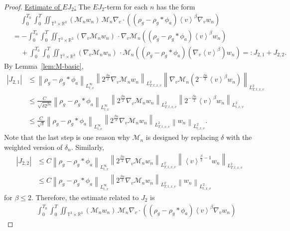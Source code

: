 \documentclass[11pt,american, reqno]{amsart}
\numberwithin{equation}{section}
\newcommand{\R}{\mathbb R}
\newcommand{\1}{\mathds{1}}
\newcommand{\Ni}{\noindent}
\newcommand{\CalM}{\mathcal{M}}
\newcommand{\vpran}[1]{\left(#1\right)}
\newcommand{\nn}{\nonumber}
\newcommand{\norm}[1]{\left\lVert#1\right\rVert}
\newcommand{\abs}[1]{\left\vert#1\right\vert}
\newcommand{\vint}[1]{\left\langle#1\right\rangle}
\newcommand{\T}{\mathbb{T}}
\numberwithin{equation}{section}
\begin{document}
\begin{proof}
\Ni \underline{Estimate of $EJ_2$:} The $EJ_2$-term for each $n$ has the form
\begin{align*}
& \quad \,
 \int_0^{T_0} \int_0^T \iint_{\T^3 \times \R^3}
   \vpran{\CalM_n w_n} \,
\CalM_n \nabla_v \cdot \vpran{\vpran{\rho_g - \rho_g \ast \phi_a} \vint{v}^\beta \nabla_v w_n}
\\
& = - \int_0^{T_0} \int_0^T \iint_{\T^3 \times \R^3}
   \vpran{\nabla_v\CalM_n w_n} \,
\cdot \nabla_v \CalM_n \vpran{\vpran{\rho_g - \rho_g \ast \phi_a} \vint{v}^\beta w_n}
\\
& \quad \,
+ \int_0^{T_0} \int_0^T \iint_{\T^3 \times \R^3}
   \vpran{\nabla_v\CalM_n w_n} \,
\cdot \CalM_n \vpran{\vpran{\rho_g - \rho_g \ast \phi_a} \vpran{\nabla_v\vint{v}^\beta} w_n}
=: J_{2, 1} + J_{2,2}.
\end{align*}
By Lemma~\ref{lem:M-basic}, 
\begin{align*}
 \abs{J_{2, 1}}
& \leq 
 \norm{\rho_g - \rho_g \ast \phi_a}_{L^\infty_{t,x}}
 \norm{2^{\frac{\beta n}{2}}\nabla_v \CalM_n w_n}_{L^2_{T,t,x,v}}
 \norm{\nabla_v \CalM_n \vpran{2^{-\frac{\beta n}{2}}\vint{v}^\beta w_n}}_{L^2_{T,t,x,v}}
\\
& \leq 
 \frac{C}{\sqrt{\delta 2^{\beta n}}}\norm{\rho_g - \rho_g \ast \phi_a}_{L^\infty_{t,x}}
 \norm{2^{\frac{\beta n}{2}}\nabla_v \CalM_n w_n}_{L^2_{T,t,x,v}} 
 \norm{2^{-\frac{\beta n}{2}}\vint{v}^\beta w_n}_{L^2_{t,x,v}}
\\
& \leq 
 \frac{C}{\sqrt{\delta}}\norm{\rho_g - \rho_g \ast \phi_a}_{L^\infty_{t,x}}
 \norm{2^{\frac{\beta n}{2}}\nabla_v \CalM_n w_n}_{L^2_{T,t,x,v}} 
 \norm{w_n}_{L^2_{t,x,v}}. 
\end{align*}
Note that the last step is one reason why $\CalM_n$ is designed by replacing $\delta$ with the weighted version of $\delta_n$. Similarly, 
\begin{align*}
 \abs{J_{2,2}}
&\leq
 C \norm{\rho_g - \rho_g \ast \phi_a}_{L^\infty_{t,x}}
 \norm{2^{\frac{\beta n}{2}}\nabla_v \CalM_n w_n}_{L^2_{T,t,x,v}}
 \norm{\vint{v}^{\frac{\beta}{2}-1} w_n}_{L^2_{T,t,x,v}}
\\
&\leq
 C \norm{\rho_g - \rho_g \ast \phi_a}_{L^\infty_{t,x}}
 \norm{2^{\frac{\beta n}{2}}\nabla_v \CalM_n w_n}_{L^2_{T,t,x,v}}
 \norm{w_n}_{L^2_{t,x,v}} 
\end{align*}
for $\beta \leq 2$. Therefore, the estimate related to $J_2$ is
\begin{align} \label{est:J-2}
& \quad \,
 \int_0^{T_0} \int_0^T \iint_{\T^3 \times \R^3}
   \vpran{\CalM_n w_n} \,
\CalM_n \nabla_v \cdot \vpran{\vpran{\rho_g - \rho_g \ast \phi_a} \vint{v}^\beta \nabla_v w_n} \nn

\end{align}
\end{proof}
\end{document}

